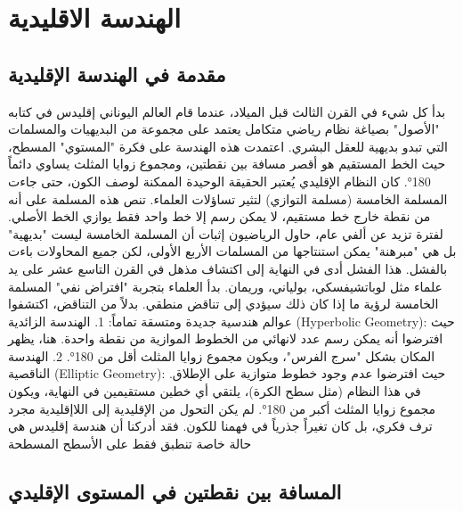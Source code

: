 \chapter{الهندسة الاقليدية}

\section[مقدمة]{مقدمة في الهندسة الإقليدية  \cite{ref1}}
بدأ كل شيء في القرن الثالث قبل الميلاد، عندما قام العالم اليوناني إقليدس في كتابه "الأصول" بصياغة نظام رياضي متكامل يعتمد على مجموعة من البديهيات والمسلمات التي تبدو بديهية للعقل البشري. اعتمدت هذه الهندسة على فكرة "المستوي" المسطح، حيث الخط المستقيم هو أقصر مسافة بين نقطتين، ومجموع زوايا المثلث يساوي دائماً 180°.
كان النظام الإقليدي يُعتبر الحقيقة الوحيدة الممكنة لوصف الكون، حتى جاءت المسلمة الخامسة (مسلمة التوازي) لتثير تساؤلات العلماء. تنص هذه المسلمة على أنه من نقطة خارج خط مستقيم، لا يمكن رسم إلا خط واحد فقط يوازي الخط الأصلي.
لفترة تزيد عن ألفي عام، حاول الرياضيون إثبات أن المسلمة الخامسة ليست "بديهية" بل هي "مبرهنة" يمكن استنتاجها من المسلمات الأربع الأولى، لكن جميع المحاولات باءت بالفشل. هذا الفشل أدى في النهاية إلى اكتشاف مذهل في القرن التاسع عشر على يد علماء مثل لوباتشيفسكي، بولياني، وريمان.
بدأ العلماء بتجربة "افتراض نفي" المسلمة الخامسة لرؤية ما إذا كان ذلك سيؤدي إلى تناقض منطقي. بدلاً من التناقض، اكتشفوا عوالم هندسية جديدة ومتسقة تماماً:
1. الهندسة الزائدية (Hyperbolic Geometry): حيث افترضوا أنه يمكن رسم عدد لانهائي من الخطوط الموازية من نقطة واحدة. هنا، يظهر المكان بشكل "سرج الفرس"، ويكون مجموع زوايا المثلث أقل من 180°.
2. الهندسة الناقصية (Elliptic Geometry): حيث افترضوا عدم وجود خطوط متوازية على الإطلاق. في هذا النظام (مثل سطح الكرة)، يلتقي أي خطين مستقيمين في النهاية، ويكون مجموع زوايا المثلث أكبر من 180°.
لم يكن التحول من الإقليدية إلى اللاإقليدية مجرد ترف فكري، بل كان تغيراً جذرياً في فهمنا للكون. فقد أدركنا أن هندسة إقليدس هي حالة خاصة تنطبق فقط على الأسطح المسطحة

\section[لمسافة بين نقطتين في المستوى الإقليدي]{المسافة بين نقطتين في المستوى الإقليدي \cite{ref1}}

